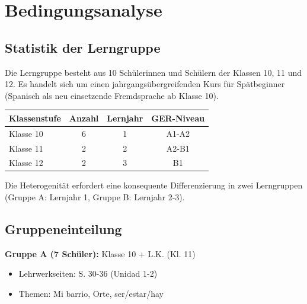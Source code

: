 \documentclass[11pt, a4paper]{article}
\begin{document}
\newpage


\tableofcontents
\newpage


\section{Bedingungsanalyse}

\subsection{Statistik der Lerngruppe}

Die Lerngruppe besteht aus 10 Schülerinnen und Schülern der Klassen 10, 11 und 12. Es handelt sich um einen jahrgangsübergreifenden Kurs für Spätbeginner (Spanisch als neu einsetzende Fremdsprache ab Klasse 10).

\begin{center}
\begin{tabular}{|l|c|c|c|}
    \hline
    \textbf{Klassenstufe} & \textbf{Anzahl} & \textbf{Lernjahr} & \textbf{GER-Niveau} \\
    \hline
    Klasse 10 & 6 & 1 & A1-A2 \\
    Klasse 11 & 2 & 2 & A2-B1 \\
    Klasse 12 & 2 & 3 & B1 \\
    \hline
\end{tabular}
\end{center}

Die Heterogenität erfordert eine konsequente Differenzierung in zwei Lerngruppen (Gruppe A: Lernjahr 1, Gruppe B: Lernjahr 2-3).

\subsection{Gruppeneinteilung}

\textbf{Gruppe A (7 Schüler):} Klasse 10 + L.K. (Kl. 11)
\begin{itemize}[leftmargin=2em]
    \item Lehrwerkseiten: S. 30-36 (Unidad 1-2)
    \item Themen: Mi barrio, Orte, ser/estar/hay
\end{itemize}
\end{document}
